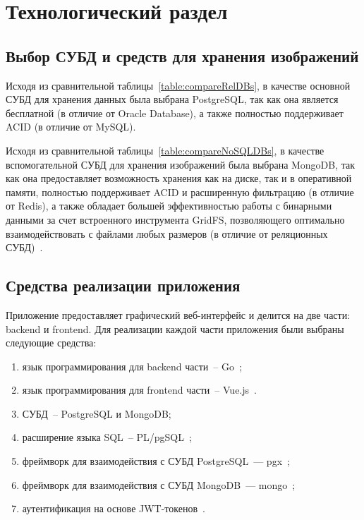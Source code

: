\chapter{Технологический раздел}

\section{Выбор СУБД и средств для хранения изображений}

Исходя из сравнительной таблицы~\ref{table:compareRelDBs}, в качестве основной СУБД для хранения данных была выбрана PostgreSQL, так как она является бесплатной (в отличие от Oracle Database), а также полностью поддерживает ACID (в отличие от MySQL).

Исходя из сравнительной таблицы~\ref{table:compareNoSQLDBs}, в качестве вспомогательной СУБД для хранения изображений была выбрана MongoDB, так как она предоставляет возможность хранения как на диске, так и в оперативной памяти, полностью поддерживает ACID и расширенную фильтрацию (в отличие от Redis), а также обладает большей эффективностью работы с бинарными данными за счет встроенного инструмента GridFS, позволяющего оптимально взаимодействовать с файлами любых размеров (в отличие от реляционных СУБД)~\cite{cmpNosqlSCDB, cmpStoreBinary, cmpStoreBinary1}.

\section{Средства реализации приложения}

Приложение предоставляет графический веб-интерфейс и делится на две части: backend и frontend.
Для реализации каждой части приложения были выбраны следующие средства:
\begin{enumerate}
	\item язык программирования для backend части~-- Go~\cite{go};
	\item язык программирования для frontend части~-- Vue.js~\cite{vue}.
	\item СУБД~-- PostgreSQL и MongoDB;
	\item расширение языка SQL~-- PL/pgSQL~\cite{plpg};
	\item фреймворк для взаимодействия с СУБД PostgreSQL~--- pgx~\cite{pgx};
	\item фреймворк для взаимодействия с СУБД MongoDB~--- mongo~\cite{mongogo};
	\item аутентификация на основе JWT-токенов~\cite{jwt}.
\end{enumerate}

